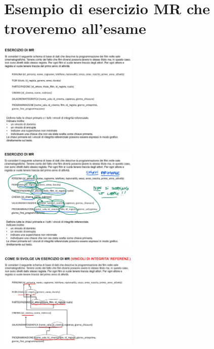 \section{Esempio di esercizio MR che troveremo all'esame}
\begin{center}
    \includegraphics[width=0.5\textwidth]{chaptersLezioniSara/img/MR_facsimile_esame1.jpg}
\end{center}
\begin{center}
    \includegraphics[width=0.5\textwidth]{chaptersLezioniSara/img/MR_facsimile_esame2.jpg}
\end{center}
\begin{center}
    \includegraphics[width=0.5\textwidth]{chaptersLezioniSara/img/MR_facsimile_esame3.jpg}
\end{center}


